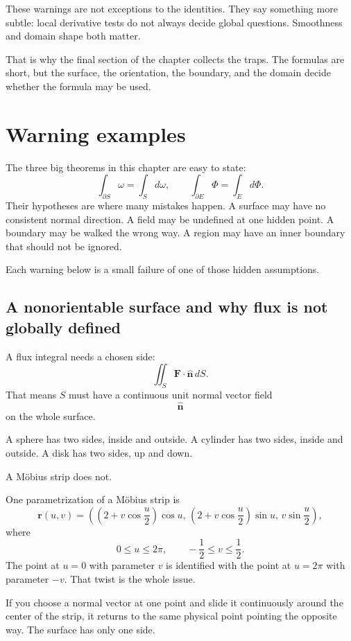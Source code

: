 These warnings are not exceptions to the identities.  They say something more subtle:
local derivative tests do not always decide global questions.  Smoothness and domain
shape both matter.

That is why the final section of the chapter collects the traps.  The formulas are short,
but the surface, the orientation, the boundary, and the domain decide whether the
formula may be used.

\section{Warning examples}
\label{sec:15.8}

The three big theorems in this chapter are easy to state:
\[
    \int_{\partial S}\omega=\int_S d\omega,
    \qquad
    \int_{\partial E}\Phi=\int_E d\Phi.
\]
Their hypotheses are where many mistakes happen.  A surface may have no consistent
normal direction.  A field may be undefined at one hidden point.  A boundary may be
walked the wrong way.  A region may have an inner boundary that should not be
ignored.

Each warning below is a small failure of one of those hidden assumptions.

\subsection{A nonorientable surface and why flux is not globally defined}

A flux integral needs a chosen side:
\[
    \iint_S \mathbf F\cdot\widehat{\mathbf n}\,dS.
\]
That means \(S\) must have a continuous unit normal vector field
\[
    \widehat{\mathbf n}
\]
on the whole surface.

A sphere has two sides, inside and outside.  A cylinder has two sides, inside and
outside.  A disk has two sides, up and down.

A M\"obius strip does not.

One parametrization of a M\"obius strip is
\[
\mathbf r(u,v)=
\left(
\left(2+v\cos\frac u2\right)\cos u,\,
\left(2+v\cos\frac u2\right)\sin u,\,
v\sin\frac u2
\right),
\]
where
\[
    0\le u\le2\pi,
    \qquad
    -\frac12\le v\le \frac12.
\]
The point at \(u=0\) with parameter \(v\) is identified with the point at \(u=2\pi\)
with parameter \(-v\).  That twist is the whole issue.

If you choose a normal vector at one point and slide it continuously around the center
of the strip, it returns to the same physical point pointing the opposite way.  The
surface has only one side.


